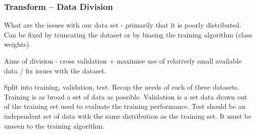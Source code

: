 \subsubsection{Transform -- Data Division}




What are the issues with our data set - primarily that it is poorly distributed. Can be fixed by truncating the dataset or by biasing the training algorithm (class weights).

Aims of division - cross validation + maximise use of relatively small available data / fix issues with the dataset.

Split into training, validation, test. Recap the needs of each of these datasets. Training is as broad a set of data as possible. Validation is a set data drawn out of the training set used to evaluate the training performance. Test should be an independent set of data with the same distribution as the training set. It must be unseen to the training algorithm.

